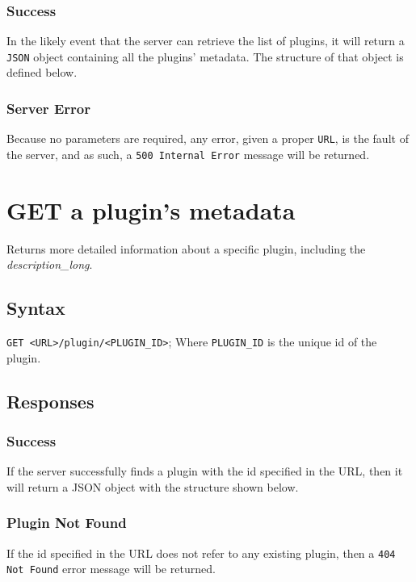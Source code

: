 \documentclass[a4paper, 12pt]{article}
\begin{document}
			\subsubsection{Success}
				In the likely event that the server can retrieve the list of plugins, it will return a \verb|JSON| object containing all the plugins' metadata. The structure of that object is defined below.

				

			\subsubsection{Server Error}
				Because no parameters are required, any error, given a proper \verb|URL|, is the fault of the server, and as such, a \verb|500 Internal Error| message will be returned.

	\section{GET a plugin's metadata}
		Returns more detailed information about a specific plugin, including the \emph{description\_long}.

		\subsection{Syntax}
			\verb|GET <URL>/plugin/<PLUGIN_ID>|; \footnotesize{Where \verb|PLUGIN_ID| is the unique id of the plugin.}

		\subsection{Responses}
			\subsubsection{Success}
				If the server successfully finds a plugin with the id specified in the URL, then it will return a JSON object with the structure shown below.

				

			\subsubsection{Plugin Not Found}
				If the id specified in the URL does not refer to any existing plugin, then a \verb|404 Not Found| error message will be returned.
\end{document}
